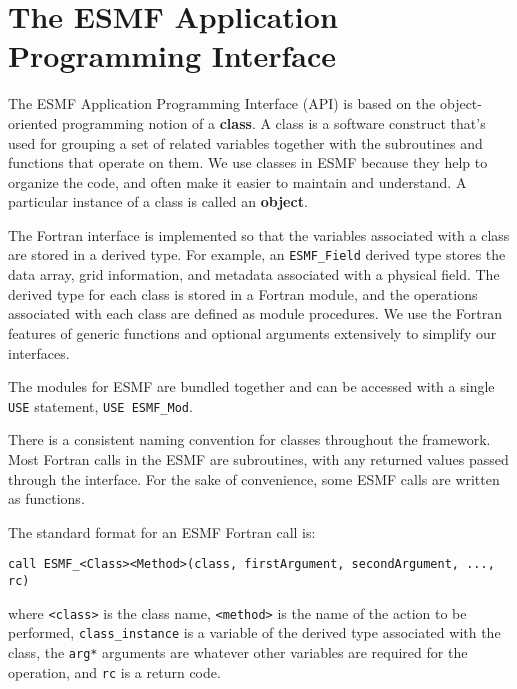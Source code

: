 
\section{The ESMF Application Programming Interface}

The ESMF Application Programming Interface (API) is based on the
object-oriented programming notion of a {\bf class}.  A class is a 
software construct that's used for grouping a set of related variables 
together with the subroutines and functions that operate on them.  We 
use classes in ESMF because they help to organize the code, and often 
make it easier to maintain and understand.  A particular instance
of a class is called an {\bf object}.  

The Fortran interface is implemented so that the variables associated
with a class are stored in a derived type.  For example, an 
{\tt ESMF\_Field} derived type stores the data array, grid 
information, and metadata associated with a physical field.
The derived type for each class is stored in a Fortran module, and 
the operations associated with each class are defined as module
procedures.  We use the Fortran features of generic functions and
optional arguments extensively to simplify our interfaces.

The modules for ESMF are bundled together and can be accessed with a 
single {\tt USE} statement, {\tt USE ESMF\_Mod}.

There is a consistent naming convention for classes throughout the
framework.  Most Fortran calls in the ESMF are subroutines, with 
any returned values passed through the interface.  For the sake of 
convenience, some ESMF calls are written as functions.

The standard format for an ESMF Fortran call is:
\begin{verbatim}
call ESMF_<Class><Method>(class, firstArgument, secondArgument, ..., rc)
\end{verbatim}

where \newline
{\tt <class>} is the class name, \newline
{\tt <method>} is the name of the action to be performed, \newline 
{\tt class\_instance} is a variable of the derived type associated 
with the class, \newline
the {\tt arg*} arguments are whatever other variables are required 
for the operation, \newline
and {\tt rc} is a return code. \newline

